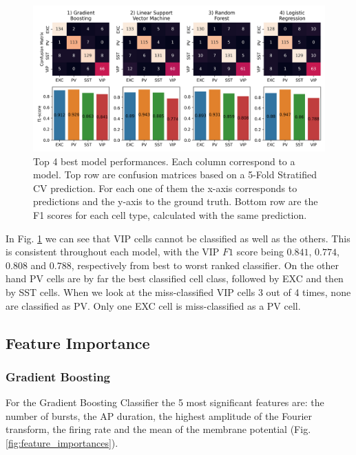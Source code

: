 \documentclass{IEEEtran}
\begin{document}
\begin{figure}[h!]
  \centering
  \includegraphics[width=\columnwidth]{figures/confusion_matrices_of_classifiers.png}
  \caption{Top 4 best model performances. Each column correspond to a model. Top row are confusion matrices based on a 5-Fold Stratified CV prediction. For each one of them the x-axis corresponds to predictions and the y-axis to the ground truth. Bottom row are the F1 scores for each cell type, calculated with the same prediction.}
  \label{fig:supervised_confusion_matrices}
\end{figure}

In Fig. \ref{fig:supervised_confusion_matrices} we can see that VIP cells cannot be classified as well as the others. This is consistent throughout each model, with the VIP $F1$ score being $0.841$, $0.774$, $0.808$ and $0.788$, respectively from best to worst ranked classifier. 
On the other hand PV cells are by far the best classified cell class, followed by EXC and then by SST cells. When we look at the miss-classified VIP cells 3 out of 4 times, none are classified as PV. Only one EXC cell is miss-classified as a PV cell.



\subsection{Feature Importance}

\subsubsection{Gradient Boosting}
For the Gradient Boosting Classifier the 5 most significant features are: the number of bursts, the AP duration, the highest amplitude of the Fourier transform, the firing rate and the mean of the membrane potential (Fig. \ref{fig:feature_importances}).
\end{document}
